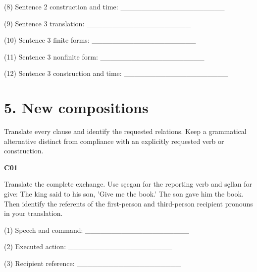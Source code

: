 \begin{minipage}{\linewidth}
(8) Sentence 2 construction and time: \_\_\_\_\_\_\_\_\_\_\_\_\_\_\_\_\_\_\_\_

(9) Sentence 3 translation: \_\_\_\_\_\_\_\_\_\_\_\_\_\_\_\_\_\_\_\_

(10) Sentence 3 finite forms: \_\_\_\_\_\_\_\_\_\_\_\_\_\_\_\_\_\_\_\_

(11) Sentence 3 nonfinite form: \_\_\_\_\_\_\_\_\_\_\_\_\_\_\_\_\_\_\_\_

(12) Sentence 3 construction and time: \_\_\_\_\_\_\_\_\_\_\_\_\_\_\_\_\_\_\_\_

\end{minipage}\par\addvspace{4pt}

\section*{5. New compositions}

Translate every clause and identify the requested relations. Keep a grammatical alternative distinct from compliance with an explicitly requested verb or construction.

\par\begin{minipage}{\linewidth}\raggedright
\textbf{C01}

Translate the complete exchange. Use sęcgan for the reporting verb and sęllan for give: The king said to his son, 'Give me the book.' The son gave him the book. Then identify the referents of the first-person and third-person recipient pronouns in your translation.

(1) Speech and command: \_\_\_\_\_\_\_\_\_\_\_\_\_\_\_\_\_\_\_\_

(2) Executed action: \_\_\_\_\_\_\_\_\_\_\_\_\_\_\_\_\_\_\_\_

(3) Recipient reference: \_\_\_\_\_\_\_\_\_\_\_\_\_\_\_\_\_\_\_\_

\end{minipage}\par\addvspace{4pt}

